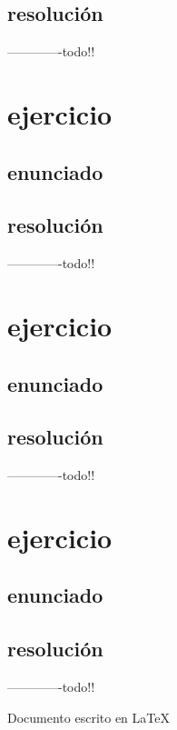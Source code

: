 \documentclass[a4paper,10pt]{article}
\begin{document}
\subsection{resolución}
-------------todo!!

\pagebreak

\section{ejercicio}
\subsection{enunciado}
\subsection{resolución}
-------------todo!!

\section{ejercicio}
\subsection{enunciado}
\subsection{resolución}
-------------todo!!

\section{ejercicio}
\subsection{enunciado}
\subsection{resolución}
-------------todo!!


\vspace*{\fill}
\raggedleft Documento escrito en \LaTeX{}
\end{document}
